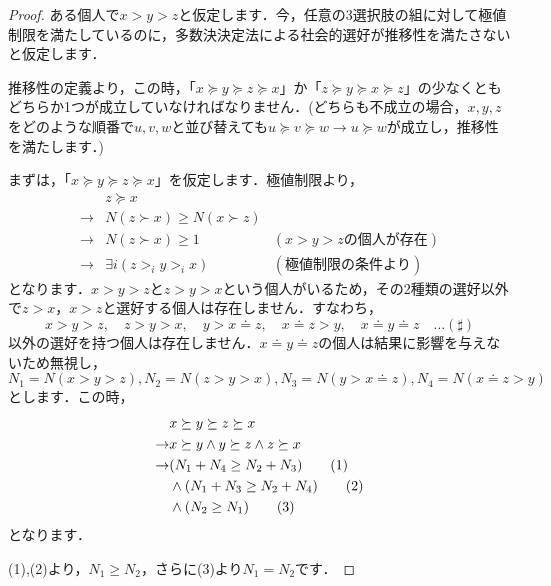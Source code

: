 \begin{proof}
ある個人で$x > y > z$と仮定します．今，任意の3選択肢の組に対して極値制限を満たしているのに，多数決決定法による社会的選好が推移性を満たさないと仮定します．

推移性の定義より，この時，「$x \succeq y \succeq z \succeq x$」か「$z \succeq y \succeq x \succeq z$」の少なくともどちらか1つが成立していなければなりません．(どちらも不成立の場合，$x,y,z$をどのような順番で$u,v,w$と並び替えても$u \succeq v \succeq w \to u \succeq w$が成立し，推移性を満たします．)

まずは，「$x \succeq y \succeq z \succeq x$」を仮定します．極値制限より，
\begin{align*}
        & z \succeq x \\
    \to & N(z \succ x) \geq N(x \succ z) \\
    \to & N(z \succ x) \geq 1 & (x > y > zの個人が存在) \\
    \to & \exists i (z >_i y >_i x) & (極値制限の条件より)
\end{align*}
となります．$x > y > z$と$z > y > x$という個人がいるため，その2種類の選好以外で$z > x$，$x > z$と選好する個人は存在しません．すなわち，
\begin{equation*}
    x > y > z ,\hspace{1em}
    z > y > x ,\hspace{1em}
    y > x \doteq z ,\hspace{1em}
    x \doteq z > y ,\hspace{1em}
    x \doteq y \doteq z \hspace{1em} \dots (\sharp)
\end{equation*}
以外の選好を持つ個人は存在しません．$x \doteq y \doteq z$の個人は結果に影響を与えないため無視し，
\begin{equation*}
    N_1 = N(x > y > z) ,
    N_2 = N(z > y > x) ,
    N_3 = N(y > x \doteq z) ,
    N_4 = N(x \doteq z > y) 
\end{equation*}
とします．この時，
\begin{align}
        & x \succeq y \succeq z \succeq x \notag\\
    \to & x \succeq y \land y \succeq z \land z \succeq x \notag\\
    \to & (N_1 + N_4 \geq N_2 + N_3)       \tag{1}\\
        & \land (N_1 + N_3 \geq N_2 + N_4) \tag{2}\\
        & \land (N_2 \geq N_1)             \tag{3}
\end{align}
となります．

(1),(2)より，$N_1 \geq N_2$，さらに(3)より$N_1 = N_2$です．


\end{proof}
